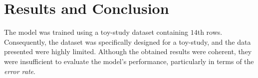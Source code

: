\documentclass[9pt,technote]{IEEEtran}
\begin{document}
\section{Results and Conclusion}
The model was trained using a toy-study dataset containing $14$th rows. Consequently, the dataset was specifically designed for a toy-study, and the data presented were highly limited. Although the obtained results were coherent, they were insufficient to evaluate the model’s performance, particularly in terms of the \textit{error rate}.



\end{document}
